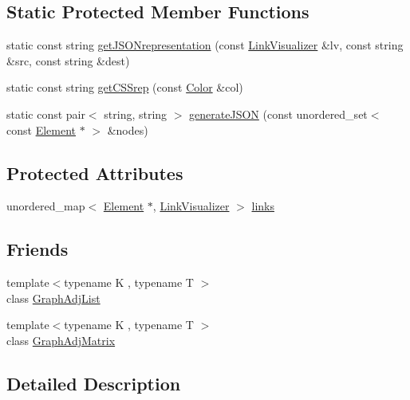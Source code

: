 \subsection*{Static Protected Member Functions}
\begin{DoxyCompactItemize}
\item 
static const string \hyperlink{classbridges_1_1_element_a89d57f5de9663d23e6e2a7aa82d1d1bc}{get\+J\+S\+O\+Nrepresentation} (const \hyperlink{classbridges_1_1_link_visualizer}{Link\+Visualizer} \&lv, const string \&src, const string \&dest)
\item 
static const string \hyperlink{classbridges_1_1_element_afdff7e2e492144055bf532a73a28b9b1}{get\+C\+S\+Srep} (const \hyperlink{classbridges_1_1_color}{Color} \&col)
\item 
static const pair$<$ string, string $>$ \hyperlink{classbridges_1_1_element_aec115a60c9bac006a01bf9825a74aeac}{generate\+J\+S\+O\+N} (const unordered\+\_\+set$<$ const \hyperlink{classbridges_1_1_element}{Element} $\ast$ $>$ \&nodes)
\end{DoxyCompactItemize}
\subsection*{Protected Attributes}
\begin{DoxyCompactItemize}
\item 
unordered\+\_\+map$<$ \hyperlink{classbridges_1_1_element}{Element} $\ast$, \hyperlink{classbridges_1_1_link_visualizer}{Link\+Visualizer} $>$ \hyperlink{classbridges_1_1_element_a6fb53728edc378f26238543b26238496}{links}
\end{DoxyCompactItemize}
\subsection*{Friends}
\begin{DoxyCompactItemize}
\item 
{\footnotesize template$<$typename K , typename T $>$ }\\class \hyperlink{classbridges_1_1_element_a1ec5df26ff2381673c41d5a8d1f222e2}{Graph\+Adj\+List}
\item 
{\footnotesize template$<$typename K , typename T $>$ }\\class \hyperlink{classbridges_1_1_element_ae8ba4af32b14c8ac8a3f8f861e914444}{Graph\+Adj\+Matrix}
\end{DoxyCompactItemize}


\subsection{Detailed Description}
